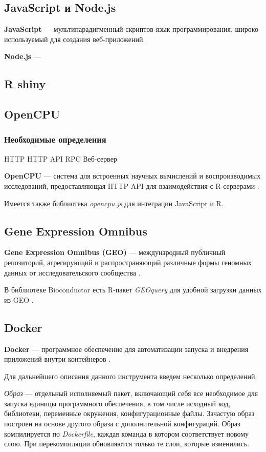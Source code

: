 \documentclass[specification,annotation]{itmo-student-thesis}
\begin{document}
\subsection{JavaScript и Node.js}
\textbf{JavaScript} --- мультипарадигменный скриптов язык программирования, широко используемый для создания веб-приложений.

\textbf{Node.js} --- \cite{nodejs}

\subsection{R shiny}
\subsection{OpenCPU}
\subsubsection{Необходимые определения}
HTTP
HTTP API
RPC
Веб-сервер

\textbf{OpenCPU} --- система для встроенных научных вычислений и воспроизводимых исследований, предоставляющая HTTP API для взаимодействия с R-серверами \cite{opencpu}.

Имеется также библиотека \textit{opencpu.js} для интеграции JavaScript и R.

\subsection{Gene Expression Omnibus}
\textbf{Gene Expression Omnibus (GEO)} --- международный публичный репозиторий, агрегирующий и распространяющий различные формы геномных данных от исследовательского сообщества \cite{geo}.

В библиотеке Bioconductor есть R-пакет \textit{GEOquery} для удобной загрузки данных из GEO \cite{geoquery}.

\subsection{Docker}
\textbf{Docker} --- программное обеспечение для автоматизации запуска и внедрения приложений внутри контейнеров \cite{docker}.

Для дальнейшего описания данного инструмента введем несколько определений.

\textit{Образ} --- отдельный исполняемый пакет, включающий себя все необходимое для запуска единицы программного обеспечения, в том числе исходный код, библиотеки, переменные окружения, конфигурационные файлы. Зачастую образ построен на основе другого образа с дополнительной конфигураций. Образ компилируется по \textit{Dockerfile}, каждая команда в котором соответствует новому слою. При перекомпиляции обновляются только те слои, которые изменились. 
\end{document}
